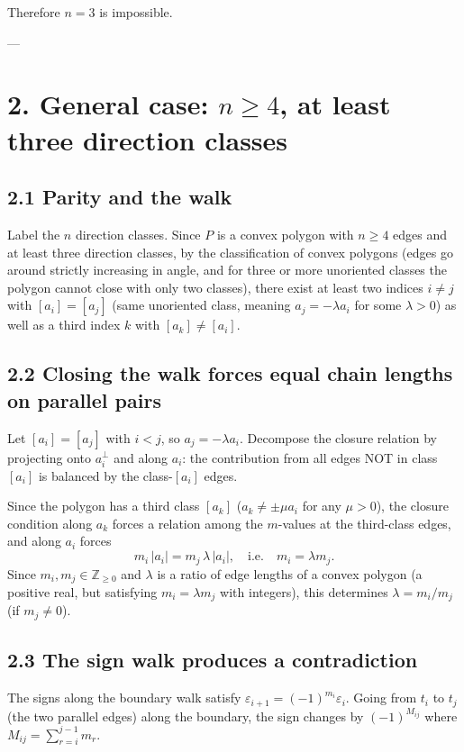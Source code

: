 Therefore \(n=3\) is impossible.

---

\section*{2. General case: \(n\ge 4\), at least three direction classes}

\subsection*{2.1 Parity and the walk}

Label the \(n\) direction classes.  Since \(P\) is a convex polygon with \(n\ge 4\) edges and at least three direction classes, by the classification of convex polygons (edges go around strictly increasing in angle, and for three or more unoriented classes the polygon cannot close with only two classes), there exist at least two indices \(i\ne j\) with \([a_i]=[a_j]\) (same unoriented class, meaning \(a_j=-\lambda a_i\) for some \(\lambda>0\)) as well as a third index \(k\) with \([a_k]\ne [a_i]\).

\subsection*{2.2 Closing the walk forces equal chain lengths on parallel pairs}

Let \([a_i]=[a_j]\) with \(i<j\), so \(a_j=-\lambda a_i\).  Decompose the closure relation by projecting onto \(a_i^\perp\) and along \(a_i\):  the contribution from all edges NOT in class \([a_i]\) is balanced by the class-\([a_i]\) edges.

Since the polygon has a third class \([a_k]\) (\(a_k\ne\pm\mu a_i\) for any \(\mu>0\)), the closure condition along \(a_k\) forces a relation among the \(m\)-values at the third-class edges, and along \(a_i\) forces
\[
  m_i\,|a_i| = m_j\,\lambda\,|a_i|,\quad\text{i.e.}\quad m_i = \lambda m_j.
\]
Since \(m_i,m_j\in\mathbb{Z}_{\ge 0}\) and \(\lambda\) is a ratio of edge lengths of a convex polygon (a positive real, but satisfying \(m_i=\lambda m_j\) with integers), this determines \(\lambda = m_i/m_j\) (if \(m_j\ne 0\)).

\subsection*{2.3 The sign walk produces a contradiction}

The signs along the boundary walk satisfy \(\varepsilon_{i+1}=(-1)^{m_i}\varepsilon_i\).  Going from \(t_i\) to \(t_j\) (the two parallel edges) along the boundary, the sign changes by \((-1)^{M_{ij}}\) where \(M_{ij}=\sum_{r=i}^{j-1}m_r\).

